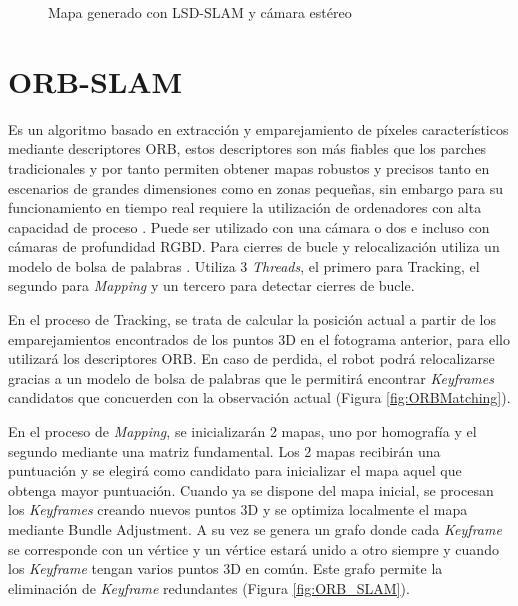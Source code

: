 \begin{figure}[H]
\begin{center}
\end{center}
\caption{Mapa generado con LSD-SLAM y cámara estéreo}
\end{figure}

\clearpage

\section{ORB-SLAM}
Es un algoritmo basado en extracción y emparejamiento de píxeles característicos mediante descriptores ORB, estos descriptores son más fiables que los parches tradicionales y por tanto permiten obtener mapas robustos y precisos tanto en escenarios de grandes dimensiones como en zonas pequeñas, sin embargo para su funcionamiento en tiempo real requiere la utilización de ordenadores con alta capacidad de proceso \cite{Mur2015orb}.
Puede ser utilizado con una cámara o dos e incluso con cámaras de profundidad RGBD. Para cierres de bucle y relocalización utiliza un modelo de bolsa de palabras \cite{galvez2012bags}.
Utiliza 3 \textit{Threads}, el primero para Tracking, el segundo para \textit{Mapping} y un tercero para detectar cierres de bucle. 

En el proceso de Tracking, se trata de calcular la posición actual a partir de los emparejamientos encontrados de los puntos 3D en el fotograma anterior, para ello utilizará los descriptores ORB.
En caso de perdida, el robot podrá relocalizarse gracias a un modelo de bolsa de palabras que le permitirá encontrar \textit{Keyframes} candidatos que concuerden con la observación actual (Figura \ref{fig:ORBMatching}).

En el proceso de \textit{Mapping}, se inicializarán 2 mapas, uno por homografía y el segundo mediante una matriz fundamental. Los 2 mapas recibirán una puntuación y se elegirá como candidato para inicializar el mapa aquel que obtenga mayor puntuación. Cuando ya se dispone del mapa inicial, se procesan los \textit{Keyframes} creando nuevos puntos 3D y se optimiza localmente el mapa mediante Bundle Adjustment. A su vez se genera un grafo donde cada \textit{Keyframe} se corresponde con un vértice y un vértice estará unido a otro siempre y cuando los \textit{Keyframe} tengan varios puntos 3D en común. Este grafo permite la eliminación de \textit{Keyframe} redundantes (Figura \ref{fig:ORB_SLAM}).

